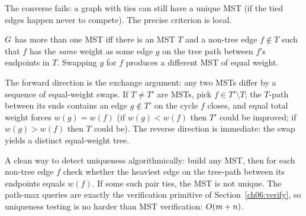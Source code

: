 The converse fails: a graph with ties can still have a unique MST (if the tied edges happen never to compete). The precise criterion is local.

\begin{proposition}
\label{ch06:tie-criterion}
$G$ has more than one MST iff there is an MST $T$ and a non-tree edge $f\notin T$ such that $f$ has the \emph{same} weight as some edge $g$ on the tree path between $f$'s endpoints in $T$. Swapping $g$ for $f$ produces a different MST of equal weight.
\end{proposition}

\begin{whybox}
The forward direction is the exchange argument: any two MSTs differ by a sequence of equal-weight swaps. If $T\ne T'$ are MSTs, pick $f\in T'\setminus T$; the $T$-path between its ends contains an edge $g\notin T'$ on the cycle $f$ closes, and equal total weight forces $w(g)=w(f)$ (if $w(g)<w(f)$ then $T'$ could be improved; if $w(g)>w(f)$ then $T$ could be). The reverse direction is immediate: the swap yields a distinct equal-weight tree.
\end{whybox}

\begin{remark}
A clean way to detect uniqueness algorithmically: build any MST, then for each non-tree edge $f$ check whether the heaviest edge on the tree-path between its endpoints equals $w(f)$. If some such pair ties, the MST is not unique. The path-max queries are exactly the verification primitive of Section~\ref{ch06:verify}, so uniqueness testing is no harder than MST verification: $O(m+n)$.
\end{remark}


